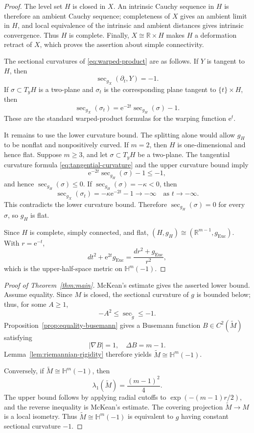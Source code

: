 \documentclass[12pt]{amsart}
\theoremstyle{definition}
\numberwithin{equation}{section}
\newcommand{\ee}{{\mathrm{e}}}
\newcommand{\wti}{\widetilde}
\newcommand{\mr}{\mathrm}
\newcommand{\R}{\mathbb{R}}
\newcommand{\bH}{\mathbb{H}}
\begin{document}
\begin{proof}
The level set \(H\) is closed in \(X\).  An intrinsic Cauchy sequence in
\(H\) is therefore an ambient Cauchy sequence; completeness of \(X\) gives
an ambient limit in \(H\), and local equivalence of the intrinsic and
ambient distances gives intrinsic convergence.  Thus \(H\) is complete.
Finally, \(X\cong\R\times H\) makes \(H\) a deformation retract of \(X\),
which proves the assertion about simple connectivity.

The sectional curvatures of \eqref{eq:warped-product} are as follows.
If \(Y\) is tangent to \(H\), then
\begin{equation}\label{eq:mixed-curvature}
  \sec_{g_X}(\partial_t,Y)=-1.
\end{equation}
If \(\sigma\subset T_yH\) is a two-plane and \(\sigma_t\) is the
corresponding plane tangent to \(\{t\}\times H\), then
\begin{equation}\label{eq:tangential-curvature}
  \sec_{g_X}(\sigma_t)
  =\ee^{-2t}\sec_{g_H}(\sigma)-1.
\end{equation}
These are the standard warped-product formulas for the warping function
\(\ee^t\).

It remains to use the lower curvature bound.  The splitting alone would
allow \(g_H\) to be nonflat and nonpositively curved.
If \(m=2\), then \(H\) is one-dimensional and hence flat.  Suppose
\(m\geq3\), and let \(\sigma\subset T_yH\) be a two-plane.
The tangential curvature formula \eqref{eq:tangential-curvature} and the
upper curvature bound imply
\[
  \ee^{-2t}\sec_{g_H}(\sigma)-1\leq-1,
\]
and hence \(\sec_{g_H}(\sigma)\leq0\).  If
\(\sec_{g_H}(\sigma)=-\kappa<0\), then
\[
  \sec_{g_X}(\sigma_t)=-\kappa\ee^{-2t}-1
  \longrightarrow-\infty
  \quad\text{as }t\longrightarrow-\infty.
\]
This contradicts the lower curvature bound.
Therefore \(\sec_{g_H}(\sigma)=0\) for every \(\sigma\), so \(g_H\) is flat.

Since \(H\) is complete, simply connected, and flat,
\((H,g_H)\cong(\R^{m-1},g_{\mr{Euc}})\).  With \(r=\ee^{-t}\),
\[
  dt^2+\ee^{2t}g_{\mr{Euc}}
  =\frac{dr^2+g_{\mr{Euc}}}{r^2},
\]
which is the upper-half-space metric on \(\mathbb H^m(-1)\).
\end{proof}

\begin{proof}[Proof of Theorem~\ref{thm:main}]
McKean's estimate gives the asserted lower bound.  Assume equality.
Since \(M\) is closed, the sectional curvature of \(g\) is bounded below;
thus, for some \(A\geq1\),
\[
  -A^2\leq\sec_{\wti g}\leq-1.
\]
Proposition~\ref{prop:equality-busemann} gives a Busemann function
\(B\in C^2(\wti M)\) satisfying
\[
  |\nabla B|=1,
  \quad
  \Delta B=m-1.
\]
Lemma~\ref{lem:riemannian-rigidity} therefore yields
\(\wti M\cong\bH^m(-1)\).

Conversely, if \(\wti M\cong\bH^m(-1)\), then
\[
  \lambda_1(\wti M)=\frac{(m-1)^2}{4}.
\]
The upper bound follows by applying radial cutoffs to
\(\exp(-(m-1)r/2)\), and the reverse inequality is McKean's estimate.
The covering projection \(\wti M\to M\) is a local isometry.  Thus
\(\wti M\cong\bH^m(-1)\) is equivalent to \(g\) having constant sectional
curvature \(-1\).
\end{proof}
\end{document}
